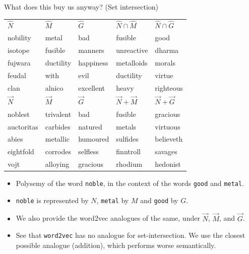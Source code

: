 \documentclass[8pt]{beamer}
\begin{document}
\begin{frame}{What does this buy us anyway? (Set intersection)}


     \begin{tabular}{l l l l l}
         $\hat N$    & $\hat M$  & $\hat G$  & $\hat N \cap \hat M$  & $\hat N \cap \hat G$      \\
         nobility    & metal     & bad       & fusible               & good                      \\
         isotope     & fusible   & manners   & unreactive            & dharma                    \\
         fujwara     & ductility & happiness & metalloids            & morals                    \\
         feudal      & with      & evil      & ductility             & virtue                    \\
         clan        & alnico    & excellent & heavy                 & righteous             \\ \midrule
         $\vec N$    & $\vec M$  & $\vec G$  & $\vec N + \vec M$     & $\vec N + \vec G$         \\
         noblest     & trivalent & bad       & fusible               & gracious                  \\
         auctoritas  & carbides  & natured   & metals                & virtuous                  \\
         abies       & metallic  & humoured  & sulfides              & believeth                 \\
         eightfold   & corrodes  & selfless  & finntroll             & savages                   \\
         vojt        & alloying  & gracious  & rhodium               & hedonist
   \end{tabular}

\begin{itemize}
\item Polysemy of the word \texttt{noble}, in the context of the words \texttt{good} and \texttt{metal}.
\item \texttt{noble} is represented by $N$, \texttt{metal} by $M$ and \texttt{good} by $G$.
\item We also provide the word2vec analogues of the same, under $\vec N$, $\vec M$, and $\vec G$.
\item See that \texttt{word2vec} has no analogue for set-intersection. We use the closest possible analogue (addition), which performs worse semantically.
\end{itemize}

\end{frame}
\end{document}
